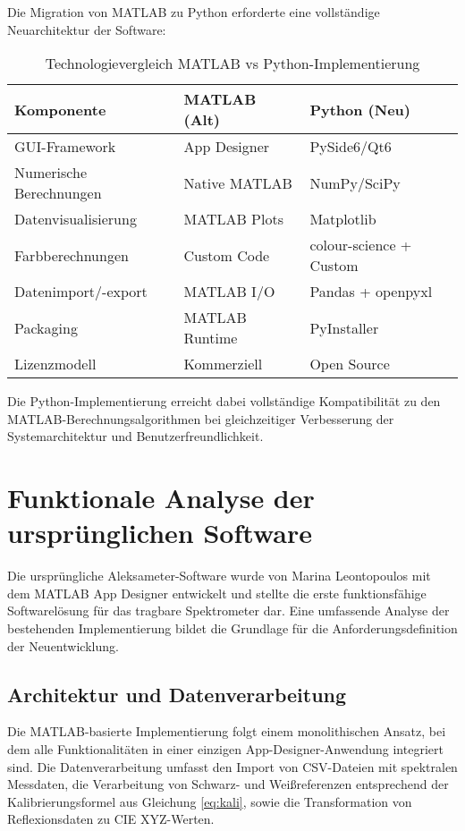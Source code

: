 Die Migration von MATLAB zu Python erforderte eine vollständige Neuarchitektur der Software:

\begin{table}[htbp]
\centering
\caption{Technologievergleich MATLAB vs Python-Implementierung}
\label{tab:tech_comparison}
\renewcommand{\arraystretch}{1.5} %
\begin{tabular}{|p{4.5cm}|p{4.5cm}|p{4.5cm}|}
\hline
\textbf{Komponente} & \textbf{MATLAB (Alt)} & \textbf{Python (Neu)} \\
\hline
GUI-Framework & App Designer & PySide6/Qt6 \\
\hline
Numerische Berechnungen & Native MATLAB & NumPy/SciPy \\
\hline
Datenvisualisierung & MATLAB Plots & Matplotlib \\
\hline
Farbberechnungen & Custom Code & colour-science + Custom \\
\hline
Datenimport/-export & MATLAB I/O & Pandas + openpyxl \\
\hline
Packaging & MATLAB Runtime & PyInstaller \\
\hline
Lizenzmodell & Kommerziell & Open Source \\
\hline
\end{tabular}
\end{table}

Die Python-Implementierung erreicht dabei vollständige Kompatibilität zu den MATLAB-Berechnungsalgorithmen bei gleichzeitiger Verbesserung der Systemarchitektur und Benutzerfreundlichkeit.

\section{Funktionale Analyse der ursprünglichen Software}

Die ursprüngliche Aleksameter-Software wurde von Marina Leontopoulos mit dem MATLAB App Designer entwickelt und stellte die erste funktionsfähige Softwarelösung für das tragbare Spektrometer dar. Eine umfassende Analyse der bestehenden Implementierung bildet die Grundlage für die Anforderungsdefinition der Neuentwicklung.

\subsection{Architektur und Datenverarbeitung}

Die MATLAB-basierte Implementierung folgt einem monolithischen Ansatz, bei dem alle Funktionalitäten in einer einzigen App-Designer-Anwendung integriert sind. Die Datenverarbeitung umfasst den Import von CSV-Dateien mit spektralen Messdaten, die Verarbeitung von Schwarz- und Weißreferenzen entsprechend der Kalibrierungsformel aus Gleichung \ref{eq:kali}, sowie die Transformation von Reflexionsdaten zu CIE XYZ-Werten. 

